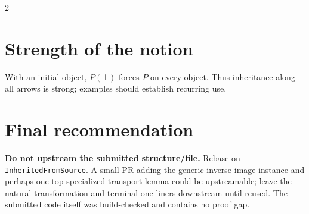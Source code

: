 \documentclass[9pt]{article}
\begin{document}
\begin{multicols}{2}
\section*{Strength of the notion}
With an initial object, $P(\bot)$ forces $P$ on every object.  Thus inheritance
along all arrows is strong; examples should establish recurring use.

\section*{Final recommendation}
\textbf{Do not upstream the submitted structure/file.}  Rebase on
\texttt{InheritedFromSource}.  A small PR adding the generic inverse-image
instance and perhaps one top-specialized transport lemma could be upstreamable;
leave the natural-transformation and terminal one-liners downstream until reused.
The submitted code itself was build-checked and contains no proof gap.
\end{multicols}
\end{document}
